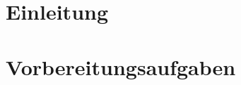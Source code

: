 % 

\newcommand{\institut}{Institut f\"ur Telekommunikationssysteme}
\newcommand{\fachgebiet}{Nachrichten\"ubertragung}
\newcommand{\veranstaltung}{Praktikum Nachrichten\"ubertragung}
\newcommand{\pdfautor}{\"Ozg\"u Dogan (326 048), Boris Henckell (325 779)}
\newcommand{\autor}{\"Ozg\"u Dogan (326 048)\\ Boris Henckell (325 779)}
\newcommand{\gruppe}{Gruppe: }


\newcommand{\pdftitle}{Nachrichten\"ubertragung\ Praktikum\ 01}
\newcommand{\prototitle}{Praktikum 01 \\ Einf\"uhrung in MATLAB}




\section{Einleitung}




\section{Vorbereitungsaufgaben}

